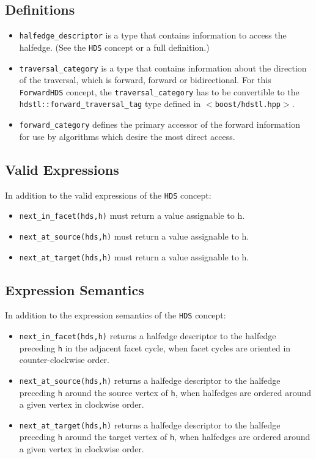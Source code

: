 \subsection{Definitions}\label{forwardhds_refforwardhds5}
\begin{itemize}
\item {\tt halfedge\_\-descriptor} is a type that contains information to access the halfedge. (See the {\tt HDS} concept or a full definition.)\item {\tt traversal\_\-category} is a type that contains information about the direction of the traversal, which is forward, forward or bidirectional. For this {\tt Forward\-HDS} concept, the {\tt traversal\_\-category} has to be convertible to the {\tt hdstl::forward\_\-traversal\_\-tag} type defined in {\tt $<$boost/hdstl.hpp$>$}.\item {\tt forward\_\-category} defines the primary accessor of the forward information for use by algorithms which desire the most direct access.\end{itemize}
\subsection{Valid Expressions}\label{forwardhds_refforwardhds6}
In addition to the valid expressions of the {\tt HDS} concept:\begin{itemize}
\item {\tt next\_\-in\_\-facet(hds,h)} must return a value assignable to h.\item {\tt next\_\-at\_\-source(hds,h)} must return a value assignable to h.\item {\tt next\_\-at\_\-target(hds,h)} must return a value assignable to h.\end{itemize}
\subsection{Expression Semantics}\label{forwardhds_refforwardhds7}
In addition to the expression semantics of the {\tt HDS} concept:\begin{itemize}
\item {\tt next\_\-in\_\-facet(hds,h)} returns a halfedge descriptor to the halfedge preceding {\tt h} in the adjacent facet cycle, when facet cycles are oriented in counter-clockwise order.\item {\tt next\_\-at\_\-source(hds,h)} returns a halfedge descriptor to the halfedge preceding {\tt h} around the source vertex of {\tt h}, when halfedges are ordered around a given vertex in clockwise order.\item {\tt next\_\-at\_\-target(hds,h)} returns a halfedge descriptor to the halfedge preceding {\tt h} around the target vertex of {\tt h}, when halfedges are ordered around a given vertex in clockwise order.\end{itemize}
